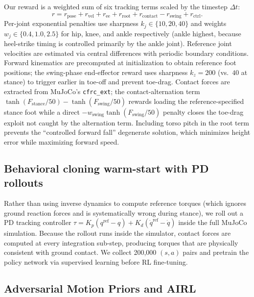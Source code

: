 \documentclass{article}
\begin{document}
Our reward is a weighted sum of six tracking terms scaled by the timestep $\Delta t$:
\[
r = r_{\text{pose}} + r_{\text{vel}} + r_{\text{ee}} + r_{\text{root}} + r_{\text{contact}} - r_{\text{swing}} + r_{\text{ctrl}}.
\]
Per-joint exponential penalties use sharpness $k_j \in \{10, 20, 40\}$ and weights $w_j \in \{0.4, 1.0, 2.5\}$ for hip, knee, and ankle respectively (ankle highest, because heel-strike timing is controlled primarily by the ankle joint). Reference joint velocities are estimated via central differences with periodic boundary conditions. Forward kinematics are precomputed at initialization to obtain reference foot positions; the swing-phase end-effector reward uses sharpness $k_z = 200$ (vs.\ $40$ at stance) to trigger earlier in toe-off and prevent toe-drag. Contact forces are extracted from MuJoCo's \texttt{cfrc\_ext}; the contact-alternation term $\tanh(F_{\text{stance}}/50) - \tanh(F_{\text{swing}}/50)$ rewards loading the reference-specified stance foot while a direct $-w_{\text{swing}} \tanh(F_{\text{swing}}/50)$ penalty closes the toe-drag exploit not caught by the alternation term. Including torso pitch in the root term prevents the ``controlled forward fall'' degenerate solution, which minimizes height error while maximizing forward speed.

\subsection{Behavioral cloning warm-start with PD rollouts}

Rather than using inverse dynamics to compute reference torques (which ignores ground reaction forces and is systematically wrong during stance), we roll out a PD tracking controller $\tau = K_p(q^{\text{ref}} - q) + K_d(\dot q^{\text{ref}} - \dot q)$ inside the full MuJoCo simulation. Because the rollout runs inside the simulator, contact forces are computed at every integration sub-step, producing torques that are physically consistent with ground contact. We collect 200{,}000 $(s, a)$ pairs and pretrain the policy network via supervised learning before RL fine-tuning.

\subsection{Adversarial Motion Priors and AIRL}
\end{document}
